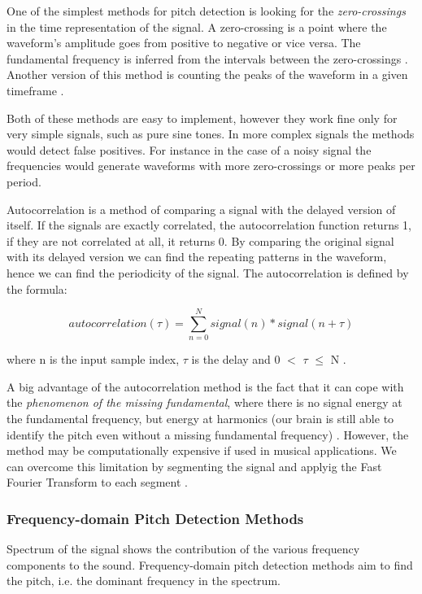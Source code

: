 \documentclass[11pt]{article} %
\begin{document}
One of the simplest methods for pitch detection is looking for the \textit{zero-crossings} in the time representation of the signal. A zero-crossing is a point where the waveform's amplitude goes from positive to negative or vice versa. The fundamental frequency is inferred from the intervals between the zero-crossings \citep*{Roads1996}. Another version of this method is counting the peaks of the waveform in a given timeframe \citep*{Hermes1992}. 

Both of these methods are easy to implement, however they work fine only for very simple signals, such as pure sine tones. In more complex signals the methods would detect false positives. For instance in the case of a noisy signal the frequencies would generate waveforms with more zero-crossings or more peaks per period. 

Autocorrelation is a method of comparing a signal with the delayed version of itself. If the signals are exactly correlated, the autocorrelation function returns 1, if they are not correlated at all, it returns 0. By comparing the original signal with its delayed version we can find the repeating patterns in the waveform, hence we can find the periodicity of the signal. The autocorrelation is defined by the formula:

\[ autocorrelation(\tau) = \sum\limits_{n=0}^{N} signal(n) * signal(n+\tau)\]

where n is the input sample index, $\tau$ is the delay and 0 $<$ $\tau$ $\leq$ N \citep*{Roads1996}. 

A big advantage of the autocorrelation method is the fact that it can cope with the \textit{phenomenon of the missing fundamental}, where there is no signal energy at the fundamental frequency, but energy at harmonics (our brain is still able to identify the pitch even without a missing fundamental frequency) \citep*{Collins2010}. However, the method may be computationally expensive if used in musical applications. We can overcome this limitation by segmenting the signal and applyig the Fast Fourier Transform to each segment \citep*{Roads1996}. 

\subsubsection{Frequency-domain Pitch Detection Methods}
Spectrum of the signal shows the contribution of the various frequency components to the sound. Frequency-domain pitch detection methods aim to find the pitch, i.e. the dominant frequency in the spectrum. 
\end{document}
